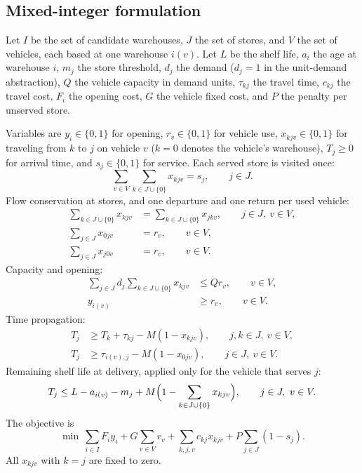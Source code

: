 \documentclass[preprint,12pt]{elsarticle}
\begin{document}
\subsection{Mixed-integer formulation}

Let $I$ be the set of candidate warehouses, $J$ the set of stores, and $V$ the set of vehicles, each based at one warehouse $i(v)$. Let $L$ be the shelf life, $a_i$ the age at warehouse $i$, $m_j$ the store threshold, $d_j$ the demand ($d_j=1$ in the unit-demand abstraction), $Q$ the vehicle capacity in demand units, $\tau_{kj}$ the travel time, $c_{kj}$ the travel cost, $F_i$ the opening cost, $G$ the vehicle fixed cost, and $P$ the penalty per unserved store.

Variables are $y_i\in\{0,1\}$ for opening, $r_v\in\{0,1\}$ for vehicle use, $x_{kjv}\in\{0,1\}$ for traveling from $k$ to $j$ on vehicle $v$ ($k=0$ denotes the vehicle's warehouse), $T_j\ge 0$ for arrival time, and $s_j\in\{0,1\}$ for service. Each served store is visited once:
\begin{equation}
\sum_{v\in V}\sum_{k\in J\cup\{0\}} x_{kjv}=s_j, \qquad j\in J.
\label{eq:visit}
\end{equation}
Flow conservation at stores, and one departure and one return per used vehicle:
\begin{align}
\sum_{k\in J\cup\{0\}} x_{kjv} &= \sum_{k\in J\cup\{0\}} x_{jkv}, \qquad j\in J,\ v\in V, \label{eq:flow}\\
\sum_{j\in J} x_{0jv} &= r_v, \qquad v\in V, \label{eq:depart}\\
\sum_{j\in J} x_{j0v} &= r_v, \qquad v\in V. \label{eq:return}
\end{align}
Capacity and opening:
\begin{align}
\sum_{j\in J} d_j \sum_{k\in J\cup\{0\}} x_{kjv} &\le Q r_v, \qquad v\in V, \label{eq:capacity}\\
y_{i(v)} &\ge r_v, \qquad v\in V. \label{eq:open}
\end{align}
Time propagation:
\begin{align}
T_j &\ge T_k+\tau_{kj}-M(1-x_{kjv}), \qquad j,k\in J,\ v\in V, \label{eq:mtz}\\
T_j &\ge \tau_{i(v),j}-M(1-x_{0jv}), \qquad j\in J,\ v\in V. \label{eq:depot-time}
\end{align}
Remaining shelf life at delivery, applied only for the vehicle that serves $j$:
\begin{equation}
T_j \le L-a_{i(v)}-m_j+M\Bigl(1-\sum_{k\in J\cup\{0\}}x_{kjv}\Bigr), \qquad j\in J,\ v\in V.
\label{eq:mlor}
\end{equation}
The objective is
\begin{equation}
\min\ \sum_{i\in I}F_i y_i+G\sum_{v\in V}r_v+\sum_{k,j,v}c_{kj}x_{kjv}+P\sum_{j\in J}(1-s_j).
\label{eq:objective}
\end{equation}
All $x_{kjv}$ with $k=j$ are fixed to zero.
\end{document}
